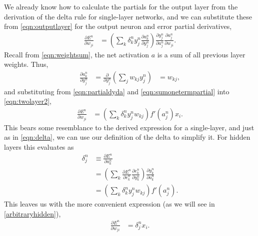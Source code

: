 \documentclass[thesis]{subfiles}
\begin{document}
We already know how to calculate the partials for the output layer from the derivation of the delta rule for single-layer networks, and we can substitute these from \cref{eqn:outputlayer} for the output neuron and error partial derivatives,
%
\begin{equation}
\begin{aligned}
    \frac{\partial E^n}{\partial w_{ji}} &= \left( \sum_k \delta^n_k y^n_j \frac{\partial a^n_k}{\partial y^n_{j}}\right)
     \frac{\partial y^n_{j}}{\partial a^n_{j}} \frac{\partial a^n_{j}}{\partial w_{ji}}.
     \label{eqn:twolayer2}
\end{aligned}
\end{equation}
%
Recall from \cref{eqn:weightsum}, the net activation $a$ is a sum of all previous layer weights. Thus,
\begin{equation}
\begin{aligned}
    \frac{\partial a^n_k}{\partial y^n_{j}} &= \frac{\partial}{\partial y^n_{j}}\left(\sum_j w_{kj} y^n_{j} \right) &= w_{kj},
\end{aligned}
\end{equation}
%
and substituting from \cref{eqn:partialdyda} and \cref{eqn:sumonetermpartial} into \cref{eqn:twolayer2},
\begin{equation}
\begin{aligned}
    \frac{\partial E^n}{\partial w_{ji}} &= \left( \sum_k \delta^n_k y^n_j w_{kj}\right)
     f'\left( a^n_j \right) x_i.
     \label{eqn:twolayer3}
\end{aligned}
\end{equation}
%
This bears some resemblance to the derived expression for a single-layer, and just as in \cref{eqn:delta}, we can use our definition of the delta to simplify it. For hidden layers this evaluates as
\begin{equation}
\label{eqn:deltahidden}
\begin{aligned}
    \delta^n_j &\equiv \frac{\partial E^n}{\partial a^n_k}\\
    &= \left( \sum_k \frac{\partial E^n}{\partial e^n_{k}} \frac{\partial e^n_{k}}{\partial y^n_{k}} \right) \frac{\partial y^n_{k}}{\partial a^n_k}\\
    &= \left(\sum_k \delta^n_k y^n_j w_{kj} \right) f'\left( a^n_j \right).
\end{aligned}
\end{equation}
%
This leaves us with the more convenient expression (as we will see in \cref{arbitraryhidden}),
\begin{equation}
\begin{aligned}
    \frac{\partial E^n}{\partial w_{ji}} &=  \delta^n_j x_i.
     \label{eqn:twolayer4}
\end{aligned}
\end{equation}
%
\end{document}
